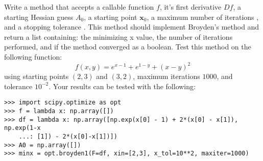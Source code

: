 Write a method that accepts a callable function $f$, it's first derivative $Df$, a starting Hessian guess $A_0$, a starting point $\textbf{x}_0$, a maximum number of iterations , and a stopping tolerance .
This method should implement Broyden's method and return a list containing: the minimizing x value, the number of iterations performed, and if the method converged as a boolean.
Test this method on the following function:
\[
f(x,y) = e^{x-1}+e^{1-y}+(x-y)^2
\]
using starting points $(2,3)$ and $(3,2)$, maximum iterations $1000$, and tolerance $10^{-2}$.
Your results can be tested with the following:
\begin{lstlisting}
>>> import scipy.optimize as opt
>>> f = lambda x: np.array([])
>>> df = lambda x: np.array([np.exp(x[0] - 1) + 2*(x[0] - x[1]), np.exp(1-x
    ...: [1]) - 2*(x[0]-x[1])])
>>> A0 = np.array([])
>>> minx = opt.broyden1(F=df, xin=[2,3], x_tol=10**2, maxiter=1000)
\end{lstlisting}

